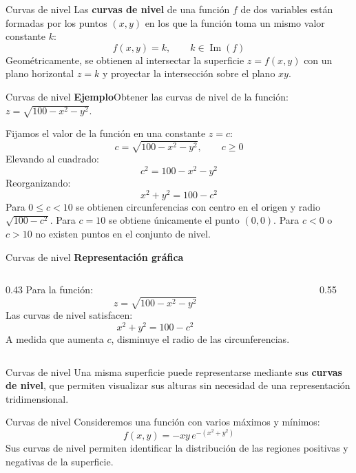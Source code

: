 \documentclass[main.tex]{subfiles}
\begin{document}
\begin{frame}{Curvas de nivel}
Las \textbf{curvas de nivel} de una función $f$ de dos variables están formadas por los puntos $(x,y)$ en los que la función toma un mismo valor constante $k$:
\[
f(x,y)=k,\qquad k\in\operatorname{Im}(f)
\]
Geométricamente, se obtienen al intersectar la superficie $z=f(x,y)$ con un plano horizontal $z=k$ y proyectar la intersección sobre el plano $xy$.
\end{frame}

\begin{frame}{Curvas de nivel}
\small\textbf{Ejemplo}\quad Obtener las curvas de nivel de la función: $z=\sqrt{100-x^2-y^2}$.
\medskip

Fijamos el valor de la función en una constante $z=c$:
\[
c=\sqrt{100-x^2-y^2},\qquad c\geq 0
\]
Elevando al cuadrado:
\[
c^2=100-x^2-y^2
\]
Reorganizando:
\[
x^2+y^2=100-c^2
\]
Para $0\leq c<10$ se obtienen circunferencias con centro en el origen y radio $\sqrt{100-c^2}$. Para $c=10$ se obtiene únicamente el punto $(0,0)$. Para $c<0$ o $c>10$ no existen puntos en el conjunto de nivel.
\end{frame}
\begin{frame}{Curvas de nivel}
\textbf{Representación gráfica}
\medskip
\begin{columns}[c]
\begin{column}{0.43\textwidth}
Para la función:
\[
z=\sqrt{100-x^2-y^2}
\]
Las curvas de nivel satisfacen:
\[
x^2+y^2=100-c^2
\]
A medida que aumenta $c$, disminuye el radio de las circunferencias.
\end{column}
\begin{column}{0.55\textwidth}
\end{column}
\end{columns}
\end{frame}
\begin{frame}{Curvas de nivel}
Una misma superficie puede representarse mediante sus \textbf{curvas de nivel}, que permiten visualizar sus alturas sin necesidad de una representación tridimensional.
\end{frame}
\begin{frame}{Curvas de nivel}
Consideremos una función con varios máximos y mínimos:
\[
f(x,y)=-xy\,e^{-(x^2+y^2)}
\]
Sus curvas de nivel permiten identificar la distribución de las regiones positivas y negativas de la superficie.
\end{frame}
\end{document}
